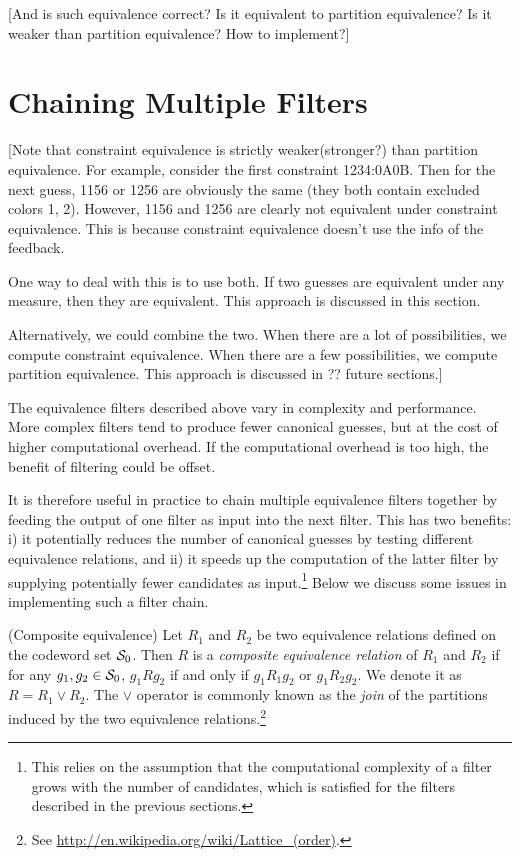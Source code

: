 [And is such equivalence correct? Is it equivalent to partition equivalence? Is it weaker than partition equivalence? How to implement?]

\section{Chaining Multiple Filters}

[Note that constraint equivalence is strictly weaker(stronger?) than partition equivalence. For example, consider the first constraint 1234:0A0B. Then for the next guess, 1156 or 1256 are obviously the same (they both contain excluded colors 1, 2). However, 1156 and 1256 are clearly not equivalent under constraint equivalence. This is because constraint equivalence doesn't use the info of the feedback.

One way to deal with this is to use both. If two guesses are equivalent under any measure, then they are equivalent. This approach is discussed in this section.

Alternatively, we could combine the two. When there are a lot of possibilities, we compute constraint equivalence. When there are a few possibilities, we compute partition equivalence. This approach is discussed in ?? future sections.]
 
The equivalence filters described above vary in complexity and performance. More complex filters tend to produce fewer canonical guesses, but at the cost of higher computational overhead. If the computational overhead is too high, the benefit of filtering could be offset.

It is therefore useful in practice to chain multiple equivalence filters together by feeding the output of one filter as input into the next filter. This has two benefits: i) it potentially reduces the number of canonical guesses by testing different equivalence relations, and ii) it speeds up the computation of the latter filter by supplying potentially fewer candidates as input.\footnote{This relies on the assumption that the computational complexity of a filter grows with the number of candidates, which is satisfied for the filters described in the previous sections.}
Below we discuss some issues in implementing such a filter chain.

\begin{definition}
(Composite equivalence) Let $R_1$ and $R_2$ be two equivalence relations defined on the codeword set $\mathcal{S}_0$. Then $R$ is a \emph{composite equivalence relation} of $R_1$ and $R_2$ if for any $g_1, g_2 \in \mathcal{S}_0$, $g_1 R g_2$ if and only if $g_1 R_1 g_2$ or $g_1 R_2 g_2$. We denote it as $R = R_1 \vee R_2$. The $\vee$ operator is commonly known as the \emph{join} of the partitions induced by the two equivalence relations.\footnote{See \url{http://en.wikipedia.org/wiki/Lattice\_(order)}.}
\end{definition}

